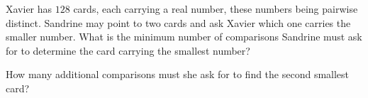 Xavier has $128$ cards, each carrying a real number, these numbers being pairwise distinct. Sandrine may point to two cards and ask Xavier which one carries the smaller number. What is the minimum number of comparisons Sandrine must ask for to determine the card carrying the smallest number?

How many additional comparisons must she ask for to find the second smallest card?
